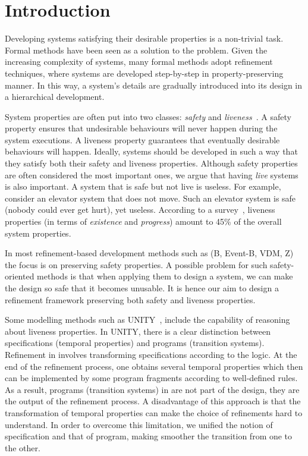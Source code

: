 \section{Introduction}
\label{sec:introduction}

Developing systems satisfying their desirable properties is a
non-trivial task.  Formal methods have been seen as a solution to the
problem.  Given the increasing complexity of systems, many
formal methods adopt refinement techniques, where systems are
developed step-by-step in property-preserving manner.  In this way,
a system's details are gradually introduced into its design in
a hierarchical development.

System properties are often put into two classes: \emph{safety}
and \emph{liveness}~\cite{DBLP:journals/tse/Lamport77}.  A safety
property ensures that undesirable behaviours will never happen
during the system executions.  A liveness property guarantees that
eventually desirable behaviours will happen.  Ideally, systems should
be developed in such a way that they satisfy both their safety and liveness
properties.  Although safety properties are often considered the most
important ones, we argue that having \emph{live} systems is also important.
A system that is safe but not live is useless.  For example, consider
an elevator system that does not move. Such an elevator system is safe
(nobody could ever get hurt), yet useless.  According to a
survey~\cite{DBLP:conf/icse/DwyerAC99}, liveness properties (in terms
of \emph{existence} and \emph{progress}) amount to 45\% of the overall
system properties.

In most refinement-based development methods such as (B, Event-B, VDM,
Z) the focus is on preserving safety properties.  A possible problem
for such safety-oriented methods is that when applying them to design a
system, we can make the design so safe that it becomes unusable.  It is
hence our aim to design a refinement framework preserving both safety
and liveness properties.

Some modelling methods such as UNITY~\cite{DBLP:books/daglib/0067338}, 
include the capability of reasoning about liveness properties.  In UNITY, there is a clear
distinction between specifications (temporal properties) and programs
(transition systems).  Refinement in \unity involves transforming
specifications according to the \unity logic.  At the end of the
refinement process, one obtains several temporal properties which then
can be implemented by some program fragments according to
well-defined rules.  As a result, programs (transition systems) in
\unity are not part of the design, they are the output of the
refinement process.  A disadvantage of this approach is that the
transformation of temporal properties can make the
choice of refinements hard to understand.  In order to overcome 
this limitation, we unified the notion of specification and that of
program, making smoother the transition from one to the other.

